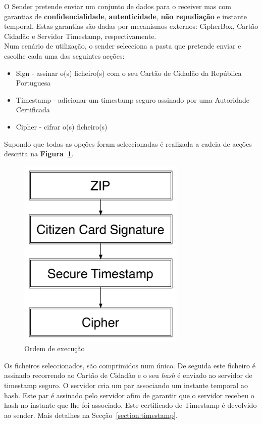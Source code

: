 O Sender pretende enviar um conjunto de dados para o receiver mas com garantias de \textbf{confidencialidade}, \textbf{autenticidade}, \textbf{não repudiação} e instante temporal. Estas garantias são dadas por mecanismos externos: CipherBox, Cartão Cidadão e Servidor Timestamp, respectivamente.\\

Num cenário de utilização, o sender selecciona a pasta que pretende enviar e escolhe cada uma das seguintes acções:
\begin{itemize}
\item Sign - assinar o(s) ficheiro(s) com o seu Cartão de Cidadão da República Portuguesa
\item Timestamp - adicionar um timestamp seguro assinado por uma Autoridade Certificada
\item Cipher - cifrar o(s) ficheiro(s)
\end{itemize}

Supondo que todas as opções foram seleccionadas é realizada a cadeia de acções descrita na \textbf{Figura~\ref{fig:order}}. \\

\begin{figure}[htp]
\centering 
\includegraphics[width=8cm]{./Figures/Architecture.pdf}
\caption{Ordem de execução}
\label{fig:order}
\end{figure}

Os ficheiros seleccionados, são comprimidos num único. De seguida este ficheiro é assinado recorrendo ao Cartão de Cidadão e o seu \textit{hash} é enviado ao servidor de timestamp seguro. O servidor cria um par associando um instante temporal ao hash. Este par é assinado pelo servidor afim de garantir que o servidor recebeu o hash no instante que lhe foi associado. Este certificado de Timestamp é devolvido ao sender. Mais detalhes na Secção~\ref{section:timestamp}.\\ 

